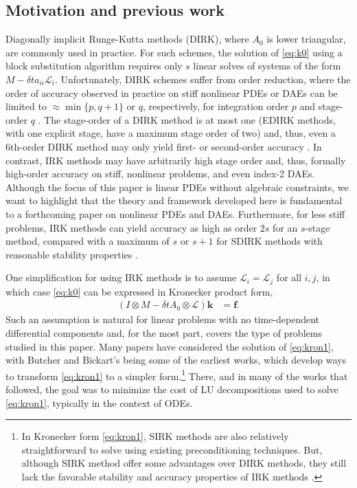 \documentclass[review]{siamart}
\begin{document}
\subsection{Motivation and previous work}\label{sec:intro:hist}

Diagonally implicit Runge-Kutta methods (DIRK), where $A_0$ is lower triangular,
are commonly used in practice. For such schemes, the solution of \eqref{eq:k0}
using a block substitution algorithm requires only $s$ linear solves of systems
of the form $ M - \delta ta_{ii}\mathcal{L}_i$. Unfortunately, DIRK schemes
suffer from order reduction, where the order of accuracy observed in practice on
stiff nonlinear PDEs or DAEs can be limited to $\approx \min\{ p, q+1\}$ or $q$,
respectively, for integration order $p$ and stage-order $q$
\cite{hairer96,kennedy16}. The stage-order of a DIRK method is at most one
(EDIRK methods, with one explicit stage, have a maximum stage order of two) and,
thus, even a 6th-order DIRK method may only yield first- or second-order
accuracy \cite{butcher00}. In contrast, IRK methods may have arbitrarily high
stage order and, thus, formally high-order accuracy on stiff, nonlinear
problems, and even index-2 DAEs. Although the focus of this paper is linear PDEs
without algebraic constraints, we want to highlight that the theory and
framework developed here is fundamental to a forthcoming paper on nonlinear PDEs
and DAEs. Furthermore, for less stiff problems, IRK methods can yield accuracy
as high as order $2s$ for an $s$-stage method, compared with a maximum of $s$ or
$s+1$ for SDIRK methods with reasonable stability properties \cite[Section
IV.6]{hairer96}.

One simplification for using IRK methods is to assume $\mathcal{L}_i =
\mathcal{L}_j$ for all $i,j$, in which case \eqref{eq:k0} can be expressed in
Kronecker product form,
%
\begin{align}\label{eq:kron1}
(I\otimes M - \delta t A_0\otimes \mathcal{L})\mathbf{k} & = \mathbf{f}.
\end{align}
%
Such an assumption is natural for linear problems with no time-dependent differential
components and, for the most part, covers the type of problems studied in this paper.
Many papers have considered the solution of \eqref{eq:kron1}, with Butcher
\cite{butcher76} and Bickart's \cite{bickart77} being some of the earliest works,
which develop ways to transform \eqref{eq:kron1} to a simpler form.\footnote{In Kronecker form \eqref{eq:kron1}, SIRK methods \cite{norsett1976runge} are also
relatively straightforward to solve using existing preconditioning techniques.
But, although SIRK method offer some advantages over DIRK methods, they still lack
the favorable stability and accuracy properties of IRK methods \cite{burrage82,orel91}.}
There, and in many of the works that followed, the goal was to minimize the cost of LU
decompositions used to solve \eqref{eq:kron1}, typically in the context of ODEs.
\end{document}
